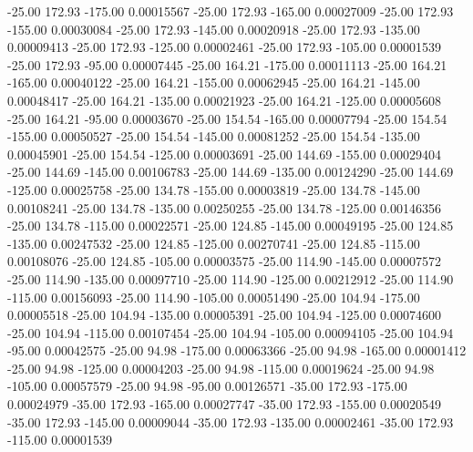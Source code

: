     -25.00    172.93   -175.00     0.00015567
    -25.00    172.93   -165.00     0.00027009
    -25.00    172.93   -155.00     0.00030084
    -25.00    172.93   -145.00     0.00020918
    -25.00    172.93   -135.00     0.00009413
    -25.00    172.93   -125.00     0.00002461
    -25.00    172.93   -105.00     0.00001539
    -25.00    172.93    -95.00     0.00007445
    -25.00    164.21   -175.00     0.00011113
    -25.00    164.21   -165.00     0.00040122
    -25.00    164.21   -155.00     0.00062945
    -25.00    164.21   -145.00     0.00048417
    -25.00    164.21   -135.00     0.00021923
    -25.00    164.21   -125.00     0.00005608
    -25.00    164.21    -95.00     0.00003670
    -25.00    154.54   -165.00     0.00007794
    -25.00    154.54   -155.00     0.00050527
    -25.00    154.54   -145.00     0.00081252
    -25.00    154.54   -135.00     0.00045901
    -25.00    154.54   -125.00     0.00003691
    -25.00    144.69   -155.00     0.00029404
    -25.00    144.69   -145.00     0.00106783
    -25.00    144.69   -135.00     0.00124290
    -25.00    144.69   -125.00     0.00025758
    -25.00    134.78   -155.00     0.00003819
    -25.00    134.78   -145.00     0.00108241
    -25.00    134.78   -135.00     0.00250255
    -25.00    134.78   -125.00     0.00146356
    -25.00    134.78   -115.00     0.00022571
    -25.00    124.85   -145.00     0.00049195
    -25.00    124.85   -135.00     0.00247532
    -25.00    124.85   -125.00     0.00270741
    -25.00    124.85   -115.00     0.00108076
    -25.00    124.85   -105.00     0.00003575
    -25.00    114.90   -145.00     0.00007572
    -25.00    114.90   -135.00     0.00097710
    -25.00    114.90   -125.00     0.00212912
    -25.00    114.90   -115.00     0.00156093
    -25.00    114.90   -105.00     0.00051490
    -25.00    104.94   -175.00     0.00005518
    -25.00    104.94   -135.00     0.00005391
    -25.00    104.94   -125.00     0.00074600
    -25.00    104.94   -115.00     0.00107454
    -25.00    104.94   -105.00     0.00094105
    -25.00    104.94    -95.00     0.00042575
    -25.00     94.98   -175.00     0.00063366
    -25.00     94.98   -165.00     0.00001412
    -25.00     94.98   -125.00     0.00004203
    -25.00     94.98   -115.00     0.00019624
    -25.00     94.98   -105.00     0.00057579
    -25.00     94.98    -95.00     0.00126571
    -35.00    172.93   -175.00     0.00024979
    -35.00    172.93   -165.00     0.00027747
    -35.00    172.93   -155.00     0.00020549
    -35.00    172.93   -145.00     0.00009044
    -35.00    172.93   -135.00     0.00002461
    -35.00    172.93   -115.00     0.00001539
